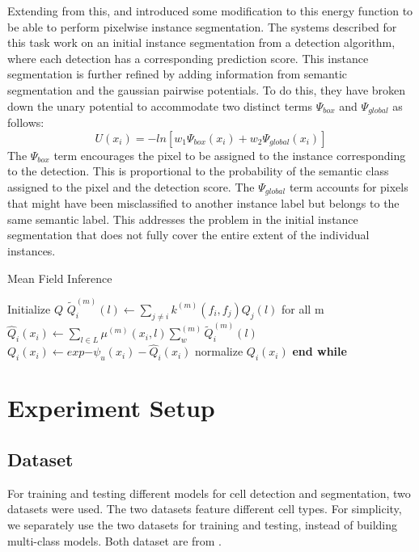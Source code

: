 \documentclass[10pt, journal, compsoc]{IEEEtran}
\begin{document}
Extending from this, \cite{Arnab2017PixelwiseIS} and \cite{Li_2018_ECCV} introduced some modification to this energy function to be able to perform  pixelwise instance segmentation. The systems described for this task work on an initial instance segmentation from a detection algorithm, where each detection has a corresponding prediction score. This instance segmentation is further refined by adding information from semantic segmentation and the gaussian pairwise potentials. To do this, they have broken down the unary potential to accommodate two distinct terms $\Psi_{box}$ and $\Psi_{global}$ as follows:
\begin{equation}
U(x_i) = -ln[w_1\Psi_{box}(x_i) + w_2\Psi_{global}(x_i)]
\end{equation}
The $\Psi_{box}$ term encourages the pixel to be assigned to the instance corresponding to the detection. This is proportional to the probability of the semantic class assigned to the pixel and the detection score. The $\Psi_{global}$ term accounts for pixels that might have been misclassified to another instance label but belongs to the same semantic label. This addresses the problem in the initial instance segmentation that does not fully cover the entire extent of the individual instances.
\begin{algorithm*}
\caption{Mean Field Inference}\label{alg:meanfieldinference}
\begin{algorithmic}[1]
\State Initialize $Q$
\State $\widetilde{Q}_i^{(m)}(l)\gets \sum_{j\neq i}k^{(m)}(f_i,f_j)Q_j(l)$ for all m
\State $\hat{Q}_i(x_i)\gets \sum_{l \in L} \mu^{(m)}(x_i,l)\sum_w^{(m)}\widetilde{Q}_i^{(m)}(l)$
\State $Q_i(x_i)\gets exp{-\psi_u(x_i) - \hat{Q}_i(x_i)}$
\State normalize $Q_i(x_i)$
\EndWhile
\State \textbf{end while}
\end{algorithmic}
\end{algorithm*}

\section{Experiment Setup}
\subsection{Dataset}
For training and testing different models for cell detection and segmentation, two datasets were used. The two datasets feature different cell types. For simplicity, we separately use the two datasets for training and testing, instead of building multi-class models. Both dataset are from \cite{waithe_dominic_2019_2632769}.
\end{document}
